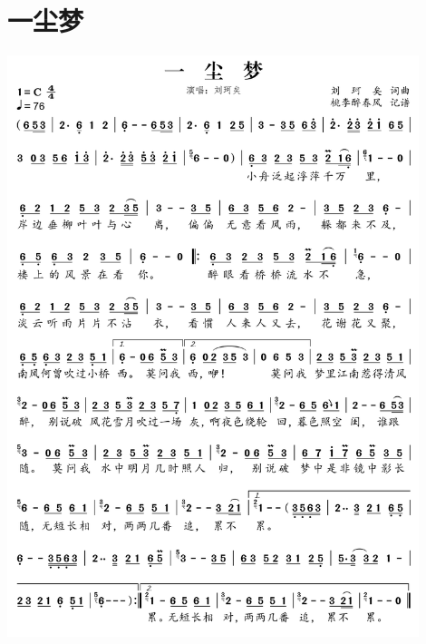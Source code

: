 \documentclass[cn,pad,twocol]{elegantbook}
\begin{document}
\section{一尘梦} \includegraphics[width=0.9\textwidth]{rpi400/20210212一尘梦.png}
\end{document}
